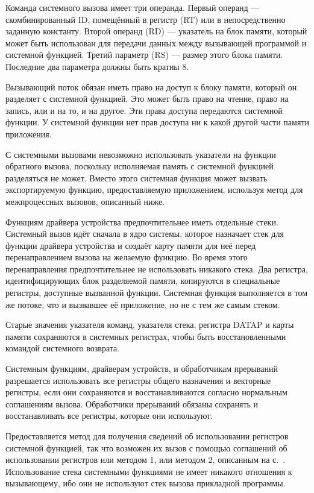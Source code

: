 \documentclass[forwardcom.tex]{subfiles}
\begin{document}
Команда системного вызова имеет три операнда. Первый операнд --- скомбинированный ID, помещённый в регистр (RT) или в непосредственно заданную константу. Второй операнд (RD) --- указатель на блок памяти, который может быть использован для передачи данных между вызывающей программой и системной функцией. Третий параметр (RS) --- размер этого блока памяти. Последние два параметра должны быть кратны 8. 

Вызывающий поток обязан иметь право на доступ к блоку памяти, который он разделяет с системной функцией. Это может быть право на чтение, право на запись, или и на то, и на другое. Эти права доступа передаются системной функции. У системной функции нет прав доступа ни к какой другой части памяти приложения.

С системными вызовами невозможно использовать указатели на функции обратного вызова, поскольку исполняемая память с системной функцией разделяться не может. Вместо этого системная функция может вызвать экспортируемую функцию, предоставляемую приложением, используя метод для межпроцессных вызовов, описанный ниже.

Функциям драйвера устройства предпочтительнее иметь отдельные стеки. Системный вызов идёт сначала в ядро системы, которое назначает стек для функции драйвера устройства и создаёт карту памяти для неё перед перенаправлением вызова на желаемую функцию. Во время этого перенаправления предпочтительнее не использовать никакого стека. Два регистра, идентифицирующих блок разделяемой памяти, копируются в специальные регистры, доступные вызванной функции. Системная функция выполняется в том же потоке, что и вызвавшее её приложение, но не с тем же самым стеком. 

Старые значения указателя команд, указателя стека, регистра DATAP и карты памяти сохраняются в системных регистрах, чтобы быть восстановленными командой системного возврата. 

Системным функциям, драйверам устройств, и обработчикам прерываний разрешается использовать все регистры общего назначения и векторные регистры, если они сохраняются и восстанавливаются согласно нормальным соглашениям вызова. Обработчики прерываний обязаны сохранять и восстанавливать все регистры, которые они используют.

Предоставляется метод для получения сведений об использовании регистров системной функцией, так что возможен их вызов с помощью соглашений об использовании регистров или методом 1, или методом 2, описанным на с.~\pageref{registerUsageConvention}. Использование стека системными функциями не имеет никакого отношения к вызывающему, ибо они не используют стек вызова прикладной программы.
\end{document}
